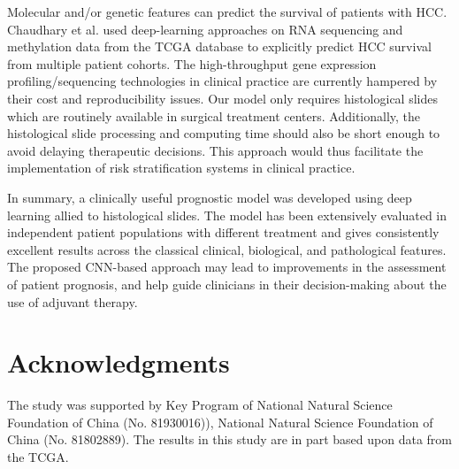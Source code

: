 \documentclass{article}
\begin{document}
Molecular and/or genetic features can predict the survival of patients with HCC\cite{zucman2015genetic}\cite{pan2020biomarkers}. Chaudhary et al. used deep-learning approaches on RNA sequencing and methylation data from the TCGA database to explicitly predict HCC survival from multiple patient cohorts. The high-throughput gene expression profiling/sequencing technologies in clinical practice are currently hampered by their cost and reproducibility issues. Our model only requires histological slides which are routinely available in surgical treatment centers. Additionally, the histological slide processing and computing time should also be short enough to avoid delaying therapeutic decisions. This approach would thus facilitate the implementation of risk stratification systems in clinical practice. 

In summary, a clinically useful prognostic model was developed using deep learning allied to histological slides. The model has been extensively evaluated in independent patient populations with different treatment and gives consistently excellent results across the classical clinical, biological, and pathological features. The proposed CNN-based approach may lead to improvements in the assessment of patient prognosis, and help guide clinicians in their decision-making about the use of adjuvant therapy. 



\section*{Acknowledgments}
The study was supported by Key Program of National Natural Science Foundation of China (No. 81930016)), National Natural Science Foundation of China (No. 81802889). The results in this study are in part based upon data from the TCGA.
 






\end{document}
